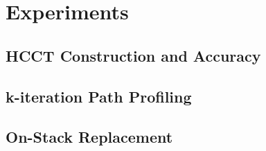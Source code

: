 \chapter{Experiments}

\section{HCCT Construction and Accuracy}

\section{k-iteration Path Profiling}

\section{On-Stack Replacement}